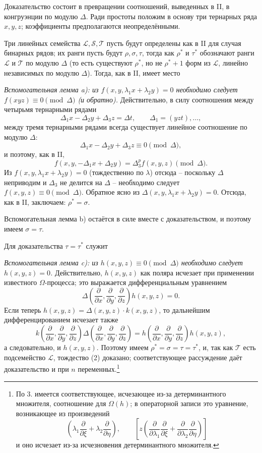 \documentclass[11pt]{article}
\begin{document}
Доказательство состоит в превращении соотношений, выведенных в II, в конгруэнции по модулю $\Delta$. Ради простоты положим в основу три тернарных ряда $x,y,z$; коэффициенты предполагаются неопределёнными.

Три линейных семейства $\mathcal L,\mathcal S,\mathcal T$ пусть будут определены как в II для случая бинарных рядов; их ранги пусть будут $\rho,\sigma,\tau$, тогда как $\rho^*$ и $\tau^*$ обозначают ранги $\mathcal L$ и $\mathcal T$ по модулю $\Delta$ (то есть существуют $\rho^*$, но не $\rho^*+1$ форм из $\mathcal L$, линейно независимых по модулю $\Delta$). Тогда, как в II, имеет место

\emph{Вспомогательная лемма a): из $f(x,y,\lambda_1x+\lambda_2y)=0$ необходимо следует $f(xyz)\equiv0\pmod{\Delta}$ (и обратно).} Действительно, в силу соотношения между четырьмя тернарными рядами
\[
  \Delta_1x-\Delta_2y+\Delta_3z=\Delta t,
  \qquad \Delta_1=(yzt),\ldots,
\]
между тремя тернарными рядами всегда существует линейное соотношение по модулю $\Delta$:
\[
  \Delta_1x-\Delta_2y+\Delta_3z\equiv0\pmod{\Delta},
\]
и поэтому, как в II,
\[
  f(x,y,-\Delta_1x+\Delta_2y)=\Delta_3^p f(x,y,z)\pmod{\Delta}.
\]
Из $f(x,y,\lambda_1x+\lambda_2y)=0$ (тождественно по $\lambda$) отсюда -- поскольку $\Delta$ неприводим и $\Delta_3$ не делится на $\Delta$ -- необходимо следует $f(x,y,z)\equiv0\pmod{\Delta}$. Обратное ясно из $\Delta(x,y,\lambda_1x+\lambda_2y)=0$. Отсюда, как в II, заключаем: $\rho^*=\sigma$.

Вспомогательная лемма b) остаётся в силе вместе с доказательством, и поэтому имеем $\sigma=\tau$.

Для доказательства $\tau=\tau^*$ служит

\emph{Вспомогательная лемма c): из $h(x,y,z)\equiv0\pmod{\Delta}$ необходимо следует $h(x,y,z)=0$.}
Действительно, $h(x,y,z)$ как поляра исчезает при применении известного $\Omega$-процесса; это выражается дифференциальным уравнением
\[
  \Delta\!\left(\frac{\partial}{\partial x},\frac{\partial}{\partial y},\frac{\partial}{\partial z}\right)h(x,y,z)=0.
\]
Если теперь $h(x,y,z)=\Delta(x,y,z)\cdot k(x,y,z)$, то дальнейшим дифференцированием исчезает также
\[
  k\!\left(\frac{\partial}{\partial x},\frac{\partial}{\partial y},\frac{\partial}{\partial z}\right)
  \Delta\!\left(\frac{\partial}{\partial x},\frac{\partial}{\partial y},\frac{\partial}{\partial z}\right)
  =
  h\!\left(\frac{\partial}{\partial x},\frac{\partial}{\partial y},\frac{\partial}{\partial z}\right)h(x,y,z),
\]
а следовательно, и $h(x,y,z)$. Поэтому имеем $\rho^*=\sigma=\tau=\tau^*$, и, так как $\mathcal T$ есть подсемейство $\mathcal L$, тождество (2) доказано; соответствующее рассуждение даёт доказательство и при $n$ переменных.\footnote{По 3. имеется соответствующее, исчезающее из-за детерминантного множителя, соотношение для $\Omega(h)$; в операторной записи это уравнение, возникающее из произведений
\[
 \left(\lambda_1\frac{\partial}{\partial \xi}+\lambda_2\frac{\partial}{\partial \eta}\right),
 \qquad
 \left[z\left(\frac{\partial}{\partial\lambda_1}\frac{\partial}{\partial \xi}
 +\frac{\partial}{\partial\lambda_2}\frac{\partial}{\partial \eta}\right)\right]
\]
и оно исчезает из-за исчезновения детерминантного множителя.}
\end{document}
